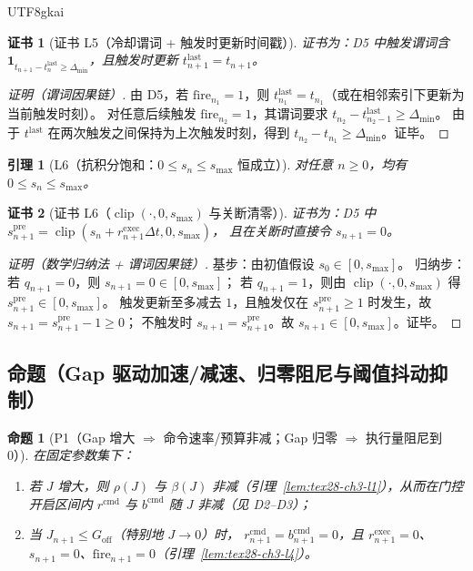 \documentclass[12pt]{article}
\newtheorem{proposition}{命题}[section]
\newtheorem{lemma}{引理}[section]
\newtheorem{Certificate}{证书}[section]
\newcommand{\indicator}[1]{\mathbf{1}_{#1}}
\newcommand{\clip}{\operatorname{clip}}
\begin{document}
\begin{CJK*}{UTF8}{gkai}
\begin{Certificate}[证书 L5（冷却谓词 + 触发时更新时间戳）]
\label{cert:tex28-ch3-l5}
证书为：D5 中触发谓词含 $\indicator{t_{n+1}-t^{\mathrm{last}}_{n}\ge\Delta_{\min}}$，且触发时更新 $t^{\mathrm{last}}_{n+1}=t_{n+1}$。
\end{Certificate}

\begin{proof}[证明（谓词因果链）]
由 D5，若 $\mathrm{fire}_{n_1}=1$，则 $t^{\mathrm{last}}_{n_1}=t_{n_1}$（或在相邻索引下更新为当前触发时刻）。
对任意后续触发 $\mathrm{fire}_{n_2}=1$，其谓词要求 $t_{n_2}-t^{\mathrm{last}}_{n_2-1}\ge\Delta_{\min}$。
由于 $t^{\mathrm{last}}$ 在两次触发之间保持为上次触发时刻，得到 $t_{n_2}-t_{n_1}\ge\Delta_{\min}$。证毕。
\end{proof}

\begin{lemma}[L6（抗积分饱和：$0\le s_n\le s_{\max}$ 恒成立）]
\label{lem:tex28-ch3-l6}
对任意 $n\ge 0$，均有 $0\le s_n\le s_{\max}$。
\end{lemma}

\begin{Certificate}[证书 L6（$\clip(\cdot,0,s_{\max})$ 与关断清零）]
\label{cert:tex28-ch3-l6}
证书为：D5 中 $s^{\mathrm{pre}}_{n+1}=\clip(s_n+r^{\mathrm{exec}}_{n+1}\Delta t,0,s_{\max})$，
且在关断时直接令 $s_{n+1}=0$。
\end{Certificate}

\begin{proof}[证明（数学归纳法 + 谓词因果链）]
基步：由初值假设 $s_0\in[0,s_{\max}]$。
归纳步：若 $q_{n+1}=0$，则 $s_{n+1}=0\in[0,s_{\max}]$；
若 $q_{n+1}=1$，则由 $\clip(\cdot,0,s_{\max})$ 得 $s^{\mathrm{pre}}_{n+1}\in[0,s_{\max}]$。
触发更新至多减去 $1$，且触发仅在 $s^{\mathrm{pre}}_{n+1}\ge 1$ 时发生，故 $s_{n+1}=s^{\mathrm{pre}}_{n+1}-1\ge 0$；
不触发时 $s_{n+1}=s^{\mathrm{pre}}_{n+1}$。故 $s_{n+1}\in[0,s_{\max}]$。证毕。
\end{proof}

\subsection{命题（Gap 驱动加速/减速、归零阻尼与阈值抖动抑制）}
\label{subsec:tex28-ch3-props}

\begin{proposition}[P1（Gap 增大 $\Rightarrow$ 命令速率/预算非减；Gap 归零 $\Rightarrow$ 执行量阻尼到 0）]
\label{prop:tex28-ch3-p1}
在固定参数集下：
\begin{enumerate}
  \item 若 $J$ 增大，则 $\rho(J)$ 与 $\beta(J)$ 非减（引理~\ref{lem:tex28-ch3-l1}），从而在门控开启区间内
  $r^{\mathrm{cmd}}$ 与 $b^{\mathrm{cmd}}$ 随 $J$ 非减（见 D2--D3）；
  \item 当 $J_{n+1}\le G_{\mathrm{off}}$（特别地 $J\to 0$）时，
  $r^{\mathrm{cmd}}_{n+1}=b^{\mathrm{cmd}}_{n+1}=0$，且 $r^{\mathrm{exec}}_{n+1}=0$、$s_{n+1}=0$、$\mathrm{fire}_{n+1}
    =0$（引理~\ref{lem:tex28-ch3-l4}）。
\end{enumerate}
\end{proposition}


\end{CJK*}
\end{document}
